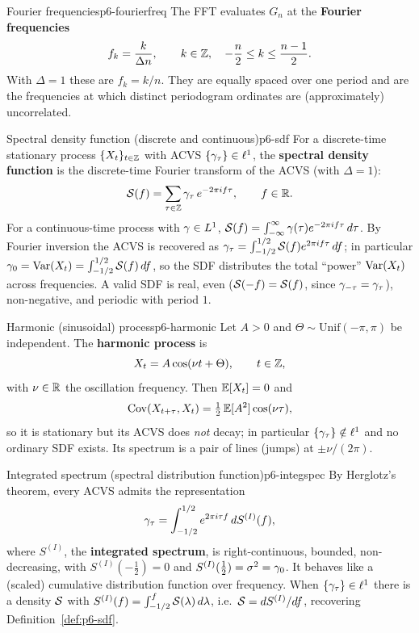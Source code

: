 \begin{definition}{Fourier frequencies}{p6-fourierfreq}
The FFT evaluates $G_n$ at the \textbf{Fourier frequencies}
\[
f_k=\frac{k}{\Delta n},\qquad k\in\mathbb{Z},\quad -\frac{n}{2}\le k\le \frac{n-1}{2}.
\]
With $\Delta=1$ these are $f_k=k/n$. They are equally spaced over one period
and are the frequencies at which distinct periodogram ordinates are
(approximately) uncorrelated.
\end{definition}

\begin{definition}{Spectral density function (discrete and continuous)}{p6-sdf}
For a discrete-time stationary process $\{X_t\}_{t\in\mathbb{Z}}$ with ACVS
$\{\gamma_\tau\}\in\ell^1$, the \textbf{spectral density function} is the
discrete-time Fourier transform of the ACVS (with $\Delta=1$):
\[
\mathcal{S}(f)=\sum_{\tau\in\mathbb{Z}}\gamma_\tau\,e^{-2\pi i f\tau},\qquad f\in\mathbb{R} .
\]
For a continuous-time process with $\gamma\in L^1$,
$\mathcal{S}(f)=\int_{-\infty}^{\infty}\gamma(\tau)e^{-2\pi i f\tau}\,d\tau$. By Fourier
inversion the ACVS is recovered as
$\gamma_\tau=\int_{-1/2}^{1/2}\mathcal{S}(f)e^{2\pi i f\tau}\,df$; in particular
$\gamma_0=\operatorname{Var}(X_t)=\int_{-1/2}^{1/2}\mathcal{S}(f)\,df$, so the SDF distributes the
total ``power'' $\operatorname{Var}(X_t)$ across frequencies. A valid SDF is real, even
($\mathcal{S}(-f)=\mathcal{S}(f)$, since $\gamma_{-\tau}=\gamma_\tau$), non-negative, and
periodic with period $1$.
\end{definition}

\begin{definition}{Harmonic (sinusoidal) process}{p6-harmonic}
Let $A>0$ and $\Theta\sim\mathrm{Unif}(-\pi,\pi)$ be independent. The
\textbf{harmonic process} is
\[
X_t=A\cos(\nu t+\Theta),\qquad t\in\mathbb{Z},
\]
with $\nu\in\mathbb{R}$ the oscillation frequency. Then $\mathbb{E}[X_t]=0$ and
\[
\operatorname{Cov}(X_{t+\tau},X_t)=\tfrac12\,\mathbb{E}[A^2]\cos(\nu\tau),
\]
so it is stationary but its ACVS does \emph{not} decay; in particular
$\{\gamma_\tau\}\notin\ell^1$ and no ordinary SDF exists. Its spectrum is a
pair of lines (jumps) at $\pm\nu/(2\pi)$.
\end{definition}

\begin{definition}{Integrated spectrum (spectral distribution function)}{p6-integspec}
By Herglotz's theorem, every ACVS admits the representation
\[
\gamma_\tau=\int_{-1/2}^{1/2} e^{2\pi i \tau f}\,dS^{(I)}(f),
\]
where $S^{(I)}$, the \textbf{integrated spectrum}, is right-continuous,
bounded, non-decreasing, with $S^{(I)}(-\tfrac12)=0$ and
$S^{(I)}(\tfrac12)=\sigma^2=\gamma_0$. It behaves like a (scaled) cumulative
distribution function over frequency. When $\{\gamma_\tau\}\in\ell^1$ there is a
density $\mathcal{S}$ with $S^{(I)}(f)=\int_{-1/2}^{f}\mathcal{S}(\lambda)\,d\lambda$, i.e.\
$\mathcal{S}=dS^{(I)}/df$, recovering Definition~\ref{def:p6-sdf}.
\end{definition}


